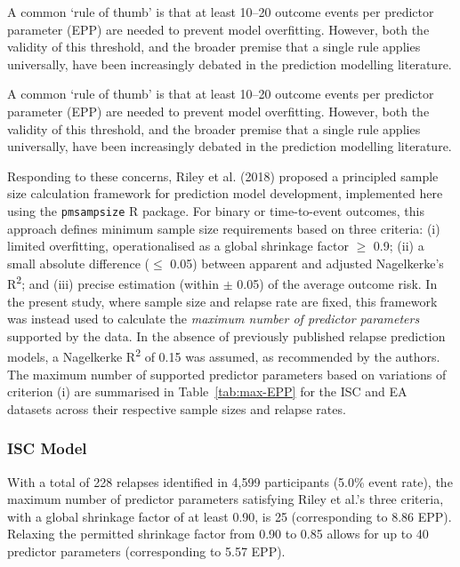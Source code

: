 A common `rule of thumb' is that at least 10--20 outcome events per predictor parameter (EPP) are needed to prevent model overfitting\cite{peduzzi1996,harrell2015}. However, both the validity of this threshold, and the broader premise that a single rule applies universally, have been increasingly debated in the prediction modelling literature\cite{courvoisier2011}.

A common `rule of thumb' is that at least 10--20 outcome events per predictor parameter (EPP) are needed to prevent model overfitting\cite{peduzzi1996,harrell2015}. However, both the validity of this threshold, and the broader premise that a single rule applies universally, have been increasingly debated in the prediction modelling literature\cite{courvoisier2011}.

Responding to these concerns, Riley et al. (2018) proposed a principled sample size calculation framework for prediction model development\cite{riley2019A}, implemented here using the \texttt{pmsampsize} R package\cite{ensor2023}. For binary or time-to-event outcomes, this approach defines minimum sample size requirements based on three criteria: (i) limited overfitting, operationalised as a global shrinkage factor $\geq$ 0.9; (ii) a small absolute difference ($\leq$ 0.05) between apparent and adjusted Nagelkerke's R\textsuperscript{2}; and (iii) precise estimation (within $\pm$ 0.05) of the average outcome risk. In the present study, where sample size and relapse rate are fixed, this framework was instead used to calculate the \textit{maximum number of predictor parameters} supported by the data. In the absence of previously published relapse prediction models, a Nagelkerke R\textsuperscript{2} of 0.15 was assumed, as recommended by the authors\cite{riley2019A}. The maximum number of supported predictor parameters based on variations of criterion (i) are summarised in Table~\ref{tab:max-EPP} for the ISC and EA datasets across their respective sample sizes and relapse rates.



\subsubsection{ISC Model}

With a total of 228 relapses identified in 4,599 participants (5.0\% event rate), the maximum number of predictor parameters satisfying Riley et al.'s three criteria, with a global shrinkage factor of at least 0.90, is 25 (corresponding to 8.86 EPP). Relaxing the permitted shrinkage factor from 0.90 to 0.85 allows for up to 40 predictor parameters (corresponding to 5.57 EPP).

